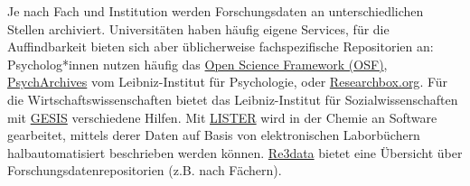 \documentclass[
  letterpaper,
  DIV=11,
  numbers=noendperiod]{scrreprt}
\begin{document}
\begin{tcolorbox}[enhanced jigsaw, left=2mm, colback=white, colframe=quarto-callout-note-color-frame, opacitybacktitle=0.6, opacityback=0, title=\textcolor{quarto-callout-note-color}{\faInfo}\hspace{0.5em}{Wo werden Forschungsdaten hochgeladen?}, toptitle=1mm, coltitle=black, colbacktitle=quarto-callout-note-color!10!white, titlerule=0mm, bottomtitle=1mm, leftrule=.75mm, breakable, rightrule=.15mm, bottomrule=.15mm, toprule=.15mm, arc=.35mm]

Je nach Fach und Institution werden Forschungsdaten an unterschiedlichen
Stellen archiviert. Universitäten haben häufig eigene Services, für die
Auffindbarkeit bieten sich aber üblicherweise fachspezifische
Repositorien an: Psycholog*innen nutzen häufig das
\href{https://osf.io/}{Open Science Framework (OSF)},
\href{https://www.psycharchives.org}{PsychArchives} vom Leibniz-Institut
für Psychologie, oder \href{researchbox.org}{Researchbox.org}. Für die
Wirtschaftswissenschaften bietet das Leibniz-Institut für
Sozialwissenschaften mit
\href{https://www.gesis.org/datenservices/daten-teilen}{GESIS}
verschiedene Hilfen. Mit
\href{https://www.nfdi4chem.de/de/lister-halbautomatische-metadatenextraktion-aus-kommentierter-experimentdokumentation-in-elabftw/}{LISTER}
wird in der Chemie an Software gearbeitet, mittels derer Daten auf Basis
von elektronischen Laborbüchern halbautomatisiert beschrieben werden
können. \href{https://www.re3data.org}{Re3data} bietet eine Übersicht
über Forschungsdatenrepositorien (z.B. nach Fächern).


\end{tcolorbox}
\end{document}

